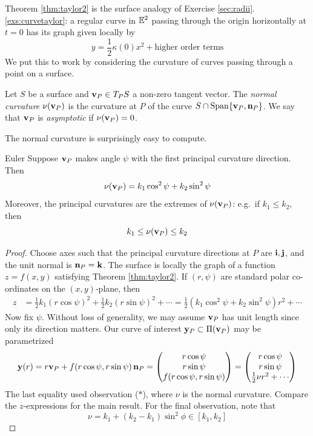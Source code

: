 
Theorem \ref{thm:taylor2} is the surface analogy of Exercise \ref*{sec:radii}.\ref{exs:curvetaylor}: a regular curve in $\mathbb{E}^2$ passing through the origin horizontally at $t=0$ has its graph given locally by
\[y=\frac 12\kappa(0)x^2+\text{higher order terms}\tag{$\ast$}\]
We put this to work by considering the curvature of curves passing through a point on a surface.

\begin{defn}{}{}
Let $S$ be a surface and ${\mathbf{v}}_P\in T_PS$ a non-zero tangent vector.\smallbreak
The \emph{normal curvature} $\nu({\mathbf{v}}_P)$ is the curvature at $P$ of the curve\footnotemark{} $S\cap\operatorname{Span}\{{\mathbf{v}}_P,{\mathbf{n}}_P\}$.\smallbreak
We say that ${\mathbf{v}}_P$ is \emph{asymptotic} if $\nu({\mathbf{v}}_P)=0$.
\end{defn}


\goodbreak

The normal curvature is surprisingly easy to compute.

\begin{thm}{Euler}{}
Suppose ${\mathbf{v}}_P$ makes angle $\psi$ with the first principal curvature direction. Then %
\[\nu({\mathbf{v}}_P)=k_1\cos^2\psi +k_2\sin^2\psi\]
Moreover, the principal curvatures are the extremes of $\nu({\mathbf{v}}_P)$: e.g.\ if $k_1\le k_2$, then
\[k_1\le\nu({\mathbf{v}}_P)\le k_2\]
\end{thm}

\begin{proof}
Choose axes such that the principal curvature directions at $P$ are ${\mathbf{i}},{\mathbf{j}}$, and the unit normal is ${\mathbf{n}}_P={\mathbf{k}}$. The surface is locally the graph of a function $z=f(x,y)$ satisfying Theorem \ref{thm:taylor2}. If $(r,\psi)$ are standard polar co-ordinates on the $(x,y)$-plane, then 
	\begin{align*}
		z&=\tfrac{1}{2}k_1(r\cos\psi)^2+\tfrac{1}{2}k_2(r\sin\psi)^2+\cdots= \frac 12(k_1\cos^2\psi+k_2\sin^2\psi)r^2+\cdots
	\end{align*}
Now fix $\psi$. Without loss of generality, we may assume ${\mathbf{v}}_P$ has unit length since only its direction matters. Our curve of interest ${\mathbf{y}}_P\subset\Pi({\mathbf{v}}_P)$ may be parametrized
	\[{\mathbf{y}}(r)= r{\mathbf{v}}_P+f(r\cos\psi,r\sin\psi)\,{\mathbf{n}}_P= \begin{pmatrix}r\cos\psi\\r\sin\psi\\f(r\cos\psi,r\sin\psi)\end{pmatrix}=\begin{pmatrix}r\cos\psi\\r\sin\psi\\\frac 12\nu r^2+\cdots\end{pmatrix}
	\]
	The last equality used observation ($\ast$), where $\nu$ is the normal curvature. Compare the $z$-expressions for the main result. For the final observation, note that
	\[\nu=k_1+(k_2-k_1)\sin^2\phi\in[k_1,k_2]\tag*{\qedhere}\]
\end{proof}


